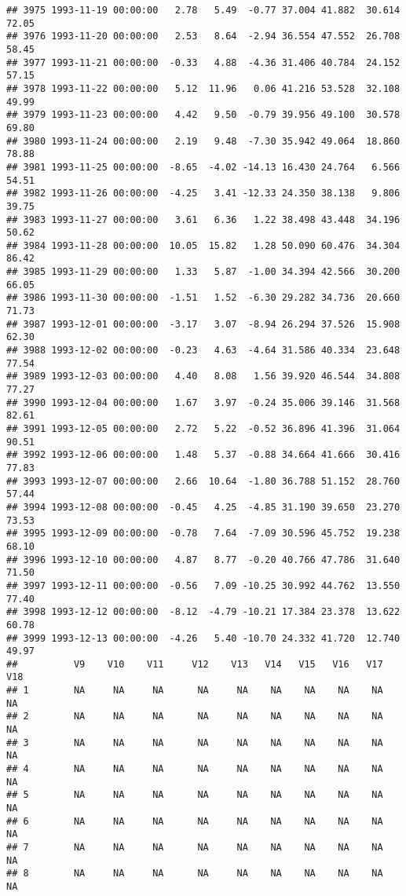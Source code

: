 \documentclass{article}\usepackage{graphicx, color}
\makeatletter
\newenvironment{kframe}{%
 \def\at@end@of@kframe{}%
 \ifinner\ifhmode%
  \def\at@end@of@kframe{\end{minipage}}%
  \begin{minipage}{\columnwidth}%
 \fi\fi%
 \def\FrameCommand##1{\hskip\@totalleftmargin \hskip-\fboxsep
 \colorbox{shadecolor}{##1}\hskip-\fboxsep
     \hskip-\linewidth \hskip-\@totalleftmargin \hskip\columnwidth}%
 \MakeFramed {\advance\hsize-\width
   \@totalleftmargin\z@ \linewidth\hsize
   \@setminipage}}%
 {\par\unskip\endMakeFramed%
 \at@end@of@kframe}
\newenvironment{knitrout}{}{} %
\makeatother
\begin{document}
\begin{knitrout}
\begin{kframe}
\begin{verbatim}
## 3975 1993-11-19 00:00:00   2.78   5.49  -0.77 37.004 41.882  30.614  72.05
## 3976 1993-11-20 00:00:00   2.53   8.64  -2.94 36.554 47.552  26.708  58.45
## 3977 1993-11-21 00:00:00  -0.33   4.88  -4.36 31.406 40.784  24.152  57.15
## 3978 1993-11-22 00:00:00   5.12  11.96   0.06 41.216 53.528  32.108  49.99
## 3979 1993-11-23 00:00:00   4.42   9.50  -0.79 39.956 49.100  30.578  69.80
## 3980 1993-11-24 00:00:00   2.19   9.48  -7.30 35.942 49.064  18.860  78.88
## 3981 1993-11-25 00:00:00  -8.65  -4.02 -14.13 16.430 24.764   6.566  54.51
## 3982 1993-11-26 00:00:00  -4.25   3.41 -12.33 24.350 38.138   9.806  39.75
## 3983 1993-11-27 00:00:00   3.61   6.36   1.22 38.498 43.448  34.196  50.62
## 3984 1993-11-28 00:00:00  10.05  15.82   1.28 50.090 60.476  34.304  86.42
## 3985 1993-11-29 00:00:00   1.33   5.87  -1.00 34.394 42.566  30.200  66.05
## 3986 1993-11-30 00:00:00  -1.51   1.52  -6.30 29.282 34.736  20.660  71.73
## 3987 1993-12-01 00:00:00  -3.17   3.07  -8.94 26.294 37.526  15.908  62.30
## 3988 1993-12-02 00:00:00  -0.23   4.63  -4.64 31.586 40.334  23.648  77.54
## 3989 1993-12-03 00:00:00   4.40   8.08   1.56 39.920 46.544  34.808  77.27
## 3990 1993-12-04 00:00:00   1.67   3.97  -0.24 35.006 39.146  31.568  82.61
## 3991 1993-12-05 00:00:00   2.72   5.22  -0.52 36.896 41.396  31.064  90.51
## 3992 1993-12-06 00:00:00   1.48   5.37  -0.88 34.664 41.666  30.416  77.83
## 3993 1993-12-07 00:00:00   2.66  10.64  -1.80 36.788 51.152  28.760  57.44
## 3994 1993-12-08 00:00:00  -0.45   4.25  -4.85 31.190 39.650  23.270  73.53
## 3995 1993-12-09 00:00:00  -0.78   7.64  -7.09 30.596 45.752  19.238  68.10
## 3996 1993-12-10 00:00:00   4.87   8.77  -0.20 40.766 47.786  31.640  71.50
## 3997 1993-12-11 00:00:00  -0.56   7.09 -10.25 30.992 44.762  13.550  77.40
## 3998 1993-12-12 00:00:00  -8.12  -4.79 -10.21 17.384 23.378  13.622  60.78
## 3999 1993-12-13 00:00:00  -4.26   5.40 -10.70 24.332 41.720  12.740  49.97
##          V9    V10    V11     V12    V13   V14   V15   V16   V17    V18
## 1        NA     NA     NA      NA     NA    NA    NA    NA    NA     NA
## 2        NA     NA     NA      NA     NA    NA    NA    NA    NA     NA
## 3        NA     NA     NA      NA     NA    NA    NA    NA    NA     NA
## 4        NA     NA     NA      NA     NA    NA    NA    NA    NA     NA
## 5        NA     NA     NA      NA     NA    NA    NA    NA    NA     NA
## 6        NA     NA     NA      NA     NA    NA    NA    NA    NA     NA
## 7        NA     NA     NA      NA     NA    NA    NA    NA    NA     NA
## 8        NA     NA     NA      NA     NA    NA    NA    NA    NA     NA

\end{verbatim}
\end{kframe}
\end{knitrout}
\end{document}
